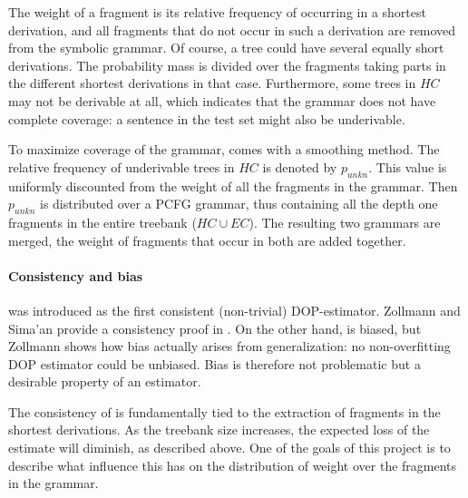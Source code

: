 The weight of a fragment is its relative frequency of occurring in a shortest derivation, and all fragments that do not occur in such a derivation are removed from the symbolic grammar. 
Of course, a tree could have several equally short derivations. The probability mass is divided over the fragments taking parts in the different shortest derivations in that case. Furthermore, some trees in $HC$ may not be derivable at all, which indicates that the grammar does not have complete coverage: a sentence in the test set might also be underivable. 

To maximize coverage of the grammar, \dops{} comes with a smoothing method. The relative frequency of underivable trees in $HC$ is denoted by $p_{unkn}$. This value is uniformly discounted from the weight of all the fragments in the grammar. Then $p_{unkn}$ is distributed over a PCFG grammar, thus containing all the depth one fragments in the entire treebank ($HC\cup EC$). The resulting two grammars are merged, the weight of fragments that occur in both are added together.


\paragraph{Consistency and bias}
\dops{} was introduced as the first consistent (non-trivial) DOP-estimator. Zollmann and Sima'an provide a consistency proof in . On the other hand, \dops{} is  biased, but Zollmann shows how bias actually arises from generalization: no non-overfitting DOP estimator could be unbiased. Bias is therefore not problematic but a desirable property of an estimator.

The consistency of \dops{} is fundamentally tied to the extraction of fragments in the shortest derivations. As the treebank size increases, the expected loss of the estimate will diminish, as described above. One of the goals of this project is to describe what influence this has on the distribution of weight over the fragments in the grammar.

